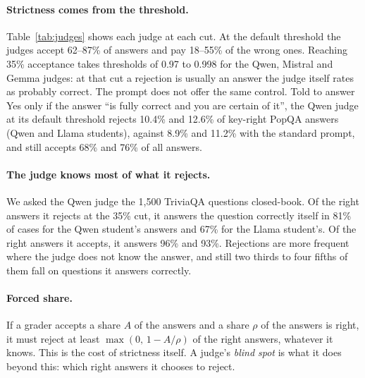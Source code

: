 \paragraph{Strictness comes from the threshold.} Table~\ref{tab:judges} shows each judge at each cut. At the default threshold the judges accept 62--87\% of answers and pay 18--55\% of the wrong ones. Reaching 35\% acceptance takes thresholds of 0.97 to 0.998 for the Qwen, Mistral and Gemma judges: at that cut a rejection is usually an answer the judge itself rates as probably correct. The prompt does not offer the same control. Told to answer Yes only if the answer ``is fully correct and you are certain of it'', the Qwen judge at its default threshold rejects 10.4\% and 12.6\% of key-right PopQA answers (Qwen and Llama students), against 8.9\% and 11.2\% with the standard prompt, and still accepts 68\% and 76\% of all answers.

\paragraph{The judge knows most of what it rejects.} We asked the Qwen judge the 1{,}500 TriviaQA questions closed-book. Of the right answers it rejects at the 35\% cut, it answers the question correctly itself in 81\% of cases for the Qwen student's answers and 67\% for the Llama student's. Of the right answers it accepts, it answers 96\% and 93\%. Rejections are more frequent where the judge does not know the answer, and still two thirds to four fifths of them fall on questions it answers correctly.

\paragraph{Forced share.} If a grader accepts a share $A$ of the answers and a share $\rho$ of the answers is right, it must reject at least $\max(0,\, 1 - A/\rho)$ of the right answers, whatever it knows. This is the cost of strictness itself. A judge's \emph{blind spot} is what it does beyond this: which right answers it chooses to reject.

